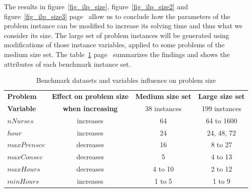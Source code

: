 The results in figure~\ref{fig_ilp_size}, figure~\ref{fig_ilp_size2} and figure~\ref{fig_ilp_size3} page~\pageref{fig_ilp_size} allow us to conclude how the parameters of the problem instance can be modified to increase its solving time and thus what we consider its size. The large set of problem instances will be generated using modifications of those instance variables, applied to some problems of the medium size set. The table~\ref{tab:ilp_size} page~\pageref{tab:ilp_size} summarizes the findings and shows the attributes of each benchmark instance set.

\begin{table}[ht] 
\centering 
\begin{tabularx}{0.75\textwidth}{|l|c|c|c|}
\hline
\textbf{Problem} & \textbf{Effect on problem size}  & \textbf{Medium size set} & \textbf{Large size set} \\

\textbf{Variable}  		& \textbf{when increasing}  & 38 instances &  199 instances \\
\hline
\textbf{$nNurses$} & increases      &  64	&  64 to 1600 \\
\textbf{$hour$}   & increases		& 24	&  24, 48, 72 \\
\textbf{$maxPrensce$} & decreases	& 16	& 8 to 27 \\
\textbf{$maxConsec$} & decreases		& 5	&  4 to 13		\\
\textbf{$maxHours$} & decreases		& 4 to 10	& 2 to 12 \\
\textbf{$minHours$} & increases		& 1 to 5	& 1 to 9\\
\hline
\end{tabularx}
\caption{Benchmark datasets and variables influence on problem size}
\label{tab:ilp_size}
\end{table}


